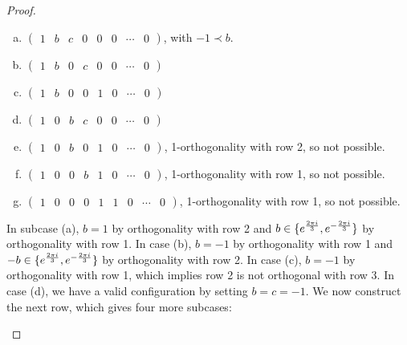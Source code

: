 \begin{lemma}
\begin{proof}
\begin{myind}{1cm}
     \begin{enumerate}[(a)]
     \item $
      \left(
       \begin{array}{cccccccc}
         1 & b  & c & 0 &0&0 &\dotsb &0
       \end{array}
      \right)
      $, with $-1 \prec b$.
     \item $
      \left(
       \begin{array}{cccccccc}
         1 & b  & 0 &c &0&0 &\dotsb &0
       \end{array}
      \right)
      $
    \item $
      \left(
       \begin{array}{cccccccc}
         1 & b  & 0 &0 &1 &0 &\dotsb &0
       \end{array}
      \right)
      $
    \item $
      \left(
       \begin{array}{cccccccc}
         1 & 0  & b &c &0 &0&\dotsb &0
       \end{array}
      \right)
      $
    \item $
      \left(
       \begin{array}{cccccccc}
         1 & 0  & b &0 &1 &0&\dotsb &0
       \end{array}
      \right)
      $, 1-orthogonality with row 2, so not possible.
     \item $
      \left(
       \begin{array}{cccccccc}
         1 & 0  & 0 &b &1 &0&\dotsb &0
       \end{array}
      \right)
      $, 1-orthogonality with row 1, so not possible.
     \item $
      \left(
       \begin{array}{ccccccccc}
         1 & 0  & 0 &0 &1 &1 & 0&\dotsb &0
       \end{array}
      \right)
      $, 1-orthogonality with row 1, so not possible.

    \end{enumerate}

    In subcase (a), $b=1$ by orthogonality with row 2 and $b\in\{e^{\frac{2\pi i}{3}},e^{-\frac{2\pi i}{3}}\}$ by orthogonality with row 1. In case (b), $b=-1$ by orthogonality with row 1 and $-b \in \{e^{\frac{2\pi i}{3}},e^{-\frac{2\pi i}{3}}\}$ by orthogonality with row 2. In case (c), $b=-1$ by orthogonality with row 1, which implies row 2 is not orthogonal with row 3. In case (d), we have a valid configuration by setting $b=c=-1$. We now construct the next row, which gives four more subcases:


\end{myind}
\end{proof}
\end{lemma}
